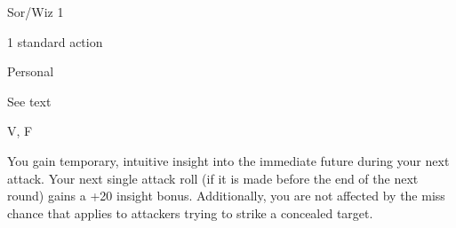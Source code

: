 
\begin{description*}
\item[Level:] Sor/Wiz 1
\item[Casting Time:] 1 standard action
\item[Range:] Personal
\item[Duration:] See text
\item[Components:] V, F
\end{description*}

You gain temporary, intuitive insight into the immediate future during your next
attack. Your next single attack roll (if it is made before the end of the next
round) gains a +20 insight bonus. Additionally, you are not affected by the miss
chance that applies to attackers trying to strike a concealed target.